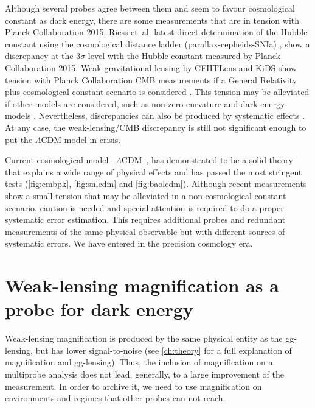 Although several probes agree between them and seem to favour cosmological constant as dark energy, there are some measurements that are in tension with Planck Collaboration 2015. Riess et~al. latest direct determination of the Hubble constant using the cosmological distance ladder (parallax-cepheids-SNIa) \cite{2016ApJ...826...56R}, show a discrepancy at the $3\sigma$ level with the Hubble constant measured by Planck Collaboration 2015. Weak-gravitational lensing  by CFHTLens and KiDS show tension with Planck Collaboration CMB measurements if a General Relativity plus cosmological constant scenario is considered \cite{2013MNRAS.430.2200K,2017arXiv170303383H,2017MNRAS.467.3024L}. This tension may be alleviated if other models are considered, such as non-zero curvature and dark energy models \cite{2016arXiv161004606J,2017arXiv170400762D,2017arXiv170108165Z}. Nevertheless, discrepancies can also be produced by systematic effects \cite{2015PhRvD..92b3003D,2017MNRAS.465.2033J}. At any case, the weak-lensing/CMB discrepancy is still not significant enough to put the $\Lambda$CDM model in crisis.
\newline

Current cosmological model --$\Lambda$CDM--, has demonstrated to be a solid theory that explains a wide range of physical effects and has passed the most stringent tests (\autoref{fig:cmbpk}, \autoref{fig:snlcdm} and \autoref{fig:baolcdm}). Although recent measurements show a small tension that may be alleviated in a  non-cosmological constant scenario, caution is needed and special attention is required to do a proper systematic error estimation. This requires additional probes and redundant measurements of the same physical observable but with different sources of systematic errors. We have entered in the precision cosmology era.

\section{Weak-lensing magnification as a probe for dark energy}
Weak-lensing magnification is produced by the same physical entity as the gg-lensing, but has lower signal-to-noise (see \autoref{ch:theory} for a full explanation of magnification and gg-lensing). Thus, the inclusion of magnification on a multiprobe analysis does not lead, generally, to a large improvement of the measurement. In order to archive it, we need to use magnification on environments and regimes that other probes can not reach. 
\newline

